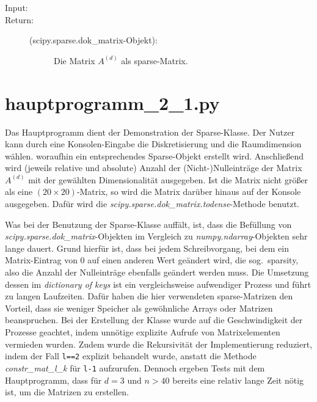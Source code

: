 \documentclass[a4paper,10pt,ngerman, openright]{sphinxmanual}
\begin{document}
\begin{fulllineitems}
\begin{fulllineitems}
\begin{description}
\item[{Input:}] \leavevmode
\item[{Return:}] \leavevmode\begin{description}
\item[{(scipy.sparse.dok\_matrix-Objekt):}] \leavevmode
Die Matrix $A^{(d)}$ als sparse-Matrix.

\end{description}

\end{description}

\end{fulllineitems}


\end{fulllineitems}

\chapter{hauptprogramm\_2\_1.py}

Das Hauptprogramm dient der Demonstration der Sparse-Klasse. Der Nutzer kann durch eine Konsolen-Eingabe die Diskretisierung und die Raumdimension wählen. woraufhin ein entsprechendes Sparse-Objekt erstellt wird. Anschließend wird (jeweils relative und absolute) Anzahl der (Nicht-)Nulleinträge der Matrix $A^{(d)}$ mit der gewählten Dimensionalität ausgegeben. Ist die Matrix nicht größer als eine $(20\times20)$-Matrix, so wird die Matrix darüber hinaus auf der Konsole ausgegeben. Dafür wird die \emph{scipy.sparse.dok\_matrix.todense}-Methode benutzt.

Was bei der Benutzung der Sparse-Klasse auffält, ist, dass die Befüllung von  \emph{scipy.sparse.dok\_matrix}-Objekten im Vergleich zu \emph{numpy.ndarray}-Objekten sehr lange dauert. Grund hierfür ist, dass bei jedem Schreibvorgang, bei dem ein Matrix-Eintrag von 0 auf einen anderen Wert geändert wird, die sog.~\glqq sparsity\grqq, also die Anzahl der Nulleinträge ebenfalls geändert werden muss. Die Umsetzung dessen im \emph{dictionary of keys} ist ein vergleichsweise aufwendiger Prozess und führt zu langen Laufzeiten. Dafür haben die hier verwendeten sparse-Matrizen den Vorteil, dass sie weniger Speicher als gewöhnliche Arrays oder Matrizen beanspruchen. Bei der Erstellung der Klasse wurde auf die Geschwindigkeit der Prozesse geachtet, indem unnötige explizite Aufrufe von Matrixelementen vermieden wurden. Zudem wurde die Rekursivität der Implementierung reduziert, indem der Fall \texttt{l==2} explizit behandelt wurde, anstatt die Methode \emph{constr\_mat\_l\_k} für \texttt{l-1} aufzurufen. Dennoch ergeben Tests mit dem Hauptprogramm, dass für $d=3$ und $n>40$ bereits eine relativ lange Zeit nötig ist, um die Matrizen zu erstellen.
\end{document}
